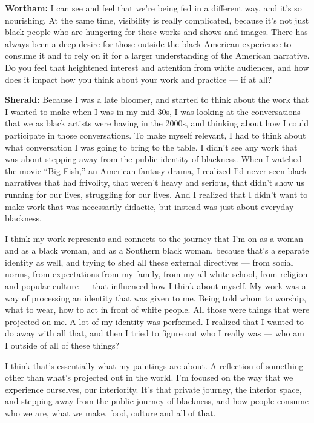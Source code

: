 \textbf{Wortham:} I can see and feel that we're being fed in a different
way, and it's so nourishing. At the same time, visibility is really
complicated, because it's not just black people who are hungering for
these works and shows and images. There has always been a deep desire
for those outside the black American experience to consume it and to
rely on it for a larger understanding of the American narrative. Do you
feel that heightened interest and attention from white audiences, and
how does it impact how you think about your work and practice --- if at
all?

\textbf{Sherald:} Because I was a late bloomer, and started to think
about the work that I wanted to make when I was in my mid-30s, I was
looking at the conversations that we as black artists were having in the
2000s, and thinking about how I could participate in those
conversations. To make myself relevant, I had to think about what
conversation I was going to bring to the table. I didn't see any work
that was about stepping away from the public identity of blackness. When
I watched the movie ``Big Fish,'' an American fantasy drama, I realized
I'd never seen black narratives that had frivolity, that weren't heavy
and serious, that didn't show us running for our lives, struggling for
our lives. And I realized that I didn't want to make work that was
necessarily didactic, but instead was just about everyday blackness.

I think my work represents and connects to the journey that I'm on as a
woman and as a black woman, and as a Southern black woman, because
that's a separate identity as well, and trying to shed all these
external directives --- from social norms, from expectations from my
family, from my all-white school, from religion and popular culture ---
that influenced how I think about myself. My work was a way of
processing an identity that was given to me. Being told whom to worship,
what to wear, how to act in front of white people. All those were things
that were projected on me. A lot of my identity was performed. I
realized that I wanted to do away with all that, and then I tried to
figure out who I really was --- who am I outside of all of these things?

I think that's essentially what my paintings are about. A reflection of
something other than what's projected out in the world. I'm focused on
the way that we experience ourselves, our interiority. It's that private
journey, the interior space, and stepping away from the public journey
of blackness, and how people consume who we are, what we make, food,
culture and all of that.


